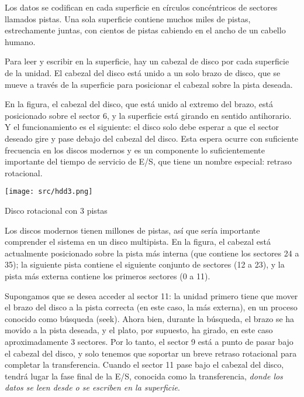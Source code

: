 \documentclass[openany]{book}
\begin{document}
Los datos se \colorbox{yellow!20}{codifican en cada superficie} en círculos concéntricos de sectores llamados \colorbox{yellow!20}{pistas}. Una sola superficie contiene muchos miles de pistas, estrechamente juntas, con cientos de pistas cabiendo en el ancho de un cabello humano. 

Para \colorbox{yellow!20}{leer y escribir} en la superficie, hay un \colorbox{yellow!20}{cabezal} de disco por cada superficie de la unidad. El cabezal del disco está unido a un solo brazo de disco, que se mueve a través de la superficie para \colorbox{yellow!20}{posicionar el cabezal} sobre la pista deseada.

En la figura, el cabezal del disco, que está unido al extremo del brazo, está posicionado sobre el sector 6, y la superficie está girando en sentido antihorario. Y el funcionamiento es el siguiente: el disco solo debe esperar a que el sector deseado gire y pase debajo del cabezal del disco. Esta espera ocurre con suficiente frecuencia en los discos modernos y es un componente lo suficientemente importante del tiempo de servicio de E/S, que tiene un nombre especial: \colorbox{yellow!20}{retraso rotacional}.

\begin{floatingfigure}[r]{0.6\textwidth}
    \texttt{[image: src/hdd3.png]}
    \caption{Disco rotacional con 3 pistas}
\end{floatingfigure}

Los discos modernos tienen millones de pistas, así que sería importante comprender el sistema en un disco multipista. En la figura, el cabezal está actualmente posicionado sobre la pista más interna (que contiene los sectores 24 a 35); la siguiente pista contiene el siguiente conjunto de sectores (12 a 23), y la pista más externa contiene los primeros sectores (0 a 11).

Supongamos que se desea acceder al sector 11: la unidad primero tiene que mover el brazo del disco a la pista correcta (en este caso, la más externa), en un proceso conocido como búsqueda (\colorbox{yellow!20}{seek}). Ahora bien, durante la búsqueda, el brazo se ha movido a la pista deseada, y el plato, por supuesto, ha girado, en este caso aproximadamente 3 sectores. Por lo tanto, el sector 9 está a punto de pasar bajo el cabezal del disco, y solo tenemos que soportar un breve \colorbox{yellow!20}{retraso rotacional} para completar la transferencia. Cuando el sector 11 pase bajo el cabezal del disco, tendrá lugar la fase final de la E/S, conocida como la \colorbox{yellow!20}{transferencia}, \textit{donde los datos se leen desde o se escriben en la superficie}. 
\end{document}
